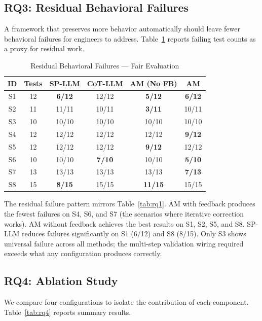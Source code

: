 \documentclass[conference]{IEEEtran}
\begin{document}
\subsection{RQ3: Residual Behavioral Failures}

A framework that preserves more behavior automatically should leave fewer behavioral failures for engineers to address. Table~\ref{tab:rq3} reports failing test counts as a proxy for residual work.

\begin{table}[htbp]
\caption{Residual Behavioral Failures --- Fair Evaluation}
\label{tab:rq3}
\centering
\footnotesize
\begin{tabular}{@{}cccccc@{}}
\toprule
\textbf{ID} & \textbf{Tests} & \textbf{SP-LLM} & \textbf{CoT-LLM} & \textbf{AM (No FB)} & \textbf{AM} \\
\midrule
S1 & 12 & \textbf{6/12} & 12/12 & \textbf{5/12} & \textbf{6/12} \\
S2 & 11 & 11/11 & 10/11 & \textbf{3/11} & 10/11 \\
S3 & 10 & 10/10 & 10/10 & 10/10 & 10/10 \\
S4 & 12 & 12/12 & 12/12 & 12/12 & \textbf{9/12} \\
S5 & 12 & 12/12 & 12/12 & \textbf{9/12} & 12/12 \\
S6 & 10 & 10/10 & \textbf{7/10} & 10/10 & \textbf{5/10} \\
S7 & 13 & 13/13 & 13/13 & 13/13 & \textbf{7/13} \\
S8 & 15 & \textbf{8/15} & 15/15 & \textbf{11/15} & 15/15 \\
\bottomrule
\end{tabular}
\end{table}

The residual failure pattern mirrors Table~\ref{tab:rq1}. AM with feedback produces the fewest failures on S4, S6, and S7 (the scenarios where iterative correction works). AM without feedback achieves the best results on S1, S2, S5, and S8. SP-LLM reduces failures significantly on S1 (6/12) and S8 (8/15). Only S3 shows universal failure across all methods; the multi-step validation wiring required exceeds what any configuration produces correctly.

\subsection{RQ4: Ablation Study}

We compare four configurations to isolate the contribution of each component. Table~\ref{tab:rq4} reports summary results.
\end{document}
